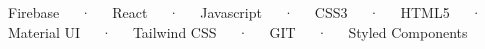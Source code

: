 

\begin{cvparagraph}

Firebase~~~·~~~React~~~·~~~Javascript~~~·~~~CSS3~~~·~~~HTML5~~~·~~~Material UI~~~·~~~Tailwind CSS~~~·~~~GIT~~~·~~~Styled Components
\end{cvparagraph}
